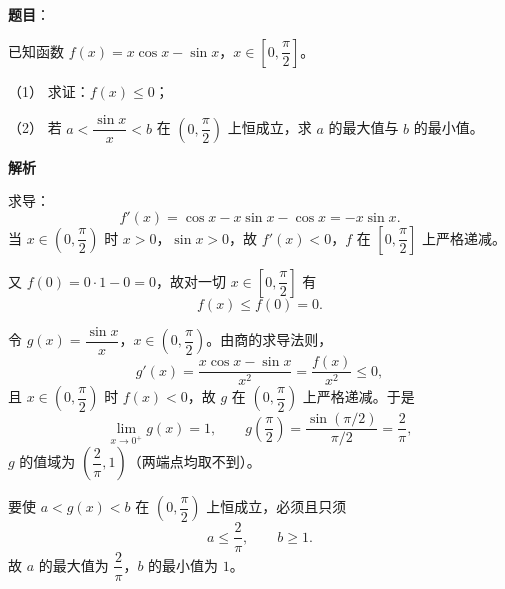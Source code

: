 \begin{answer}

\textbf{题目}：

已知函数 $f(x)=x\cos x-\sin x$，$x\in\left[0,\dfrac\pi2\right]$。

（1） 求证：$f(x)\leqslant 0$；

（2） 若 $a<\dfrac{\sin x}x<b$ 在 $\left(0,\dfrac\pi2\right)$ 上恒成立，求 $a$ 的最大值与 $b$ 的最小值。

\textbf{解析}


求导：
\nopagebreak[4]
\[f'(x)=\cos x-x\sin x-\cos x=-x\sin x .\]
当 $x\in\left(0,\dfrac\pi2\right)$ 时 $x>0$，$\sin x>0$，故 $f'(x)<0$，$f$ 在 $\left[0,\dfrac\pi2\right]$ 上严格递减。

又 $f(0)=0\cdot1-0=0$，故对一切 $x\in\left[0,\dfrac\pi2\right]$ 有
\nopagebreak[4]
\[f(x)\leqslant f(0)=0 .\]


令 $g(x)=\dfrac{\sin x}x$，$x\in\left(0,\dfrac\pi2\right)$。由商的求导法则，
\nopagebreak[4]
\[g'(x)=\frac{x\cos x-\sin x}{x^2}=\frac{f(x)}{x^2}\leqslant0,\]
且 $x\in\left(0,\dfrac\pi2\right)$ 时 $f(x)<0$，故 $g$ 在 $\left(0,\dfrac\pi2\right)$ 上严格递减。于是
\nopagebreak[4]
\[\lim_{x\to0^+}g(x)=1,\qquad g\left(\frac\pi2\right)=\frac{\sin(\pi/2)}{\pi/2}=\frac2\pi,\]
$g$ 的值域为 $\left(\dfrac2\pi,1\right)$（两端点均取不到）。

要使 $a<g(x)<b$ 在 $\left(0,\dfrac\pi2\right)$ 上恒成立，必须且只须
\nopagebreak[4]
\[a\leqslant\frac2\pi,\qquad b\geqslant1 .\]
故 $a$ 的最大值为 $\dfrac2\pi$，$b$ 的最小值为 $1$。



\end{answer}
